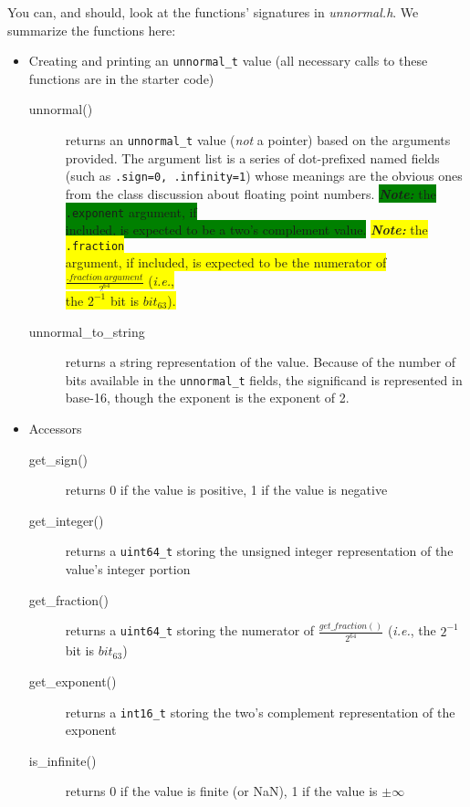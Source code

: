 You can, and should, look at the functions' signatures in \textit{unnormal.h}.
We summarize the functions here:

\begin{itemize}
    \item Creating and printing an \lstinline{unnormal_t} value (all necessary calls to these functions are in the starter code)
    \begin{description}
        \item[unnormal()] returns an \lstinline{unnormal_t} value (\textit{not} a pointer) based on the arguments provided.
            The argument list is a series of dot-prefixed named fields (such as \lstinline{.sign=0, .infinity=1}) whose meanings are the obvious ones from the class discussion about floating point numbers.
            \colorbox{green}{\textit{\textbf{Note: }} the \lstinline{.exponent} argument, if} \\ \colorbox{green}{included, is expected to be a two's complement value.}
            \colorbox{yellow}{\textit{\textbf{Note: }} the \lstinline{.fraction}} \\ \colorbox{yellow}{argument, if included, is expected to be the numerator of $\frac{.fraction\ argument}{2^{64}}$ (\textit{i.e.},} \\ \colorbox{yellow}{the $2^{-1}$ bit is $bit_{63}$)\@.}
        \item[unnormal\_to\_string] returns a string representation of the value.
            Because of the number of bits available in the \lstinline{unnormal_t} fields, the significand is represented in base-16, though the exponent is the exponent of 2.
    \end{description}
    \item Accessors
    \begin{description}
        \item[get\_sign()] returns 0 if the value is positive, 1 if the value is negative
        \item[get\_integer()] returns a \lstinline{uint64_t} storing the unsigned integer representation of the value's integer portion
        \item[get\_fraction()] returns a \lstinline{uint64_t} storing the numerator of $\frac{get\_fraction()}{2^{64}}$ (\textit{i.e.}, the $2^{-1}$ bit is $bit_{63}$)
        \item[get\_exponent()] returns a \lstinline{int16_t} storing the two's complement representation of the exponent
        \item[is\_infinite()] returns 0 if the value is finite (or NaN), 1 if the value is $\pm\infty$

\end{description}
\end{itemize}
